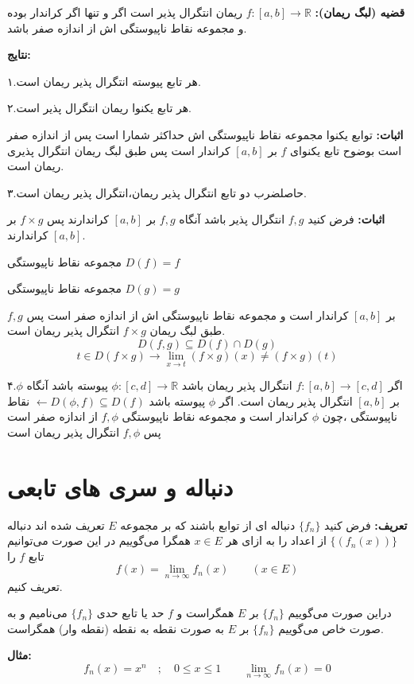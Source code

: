 \documentclass[12pt]{report}
\begin{document}
\textbf{قضیه (لبگ ریمان):}
$f:[a, b] \rightarrow \mathbb{R}$
ریمان انتگرال پذیر است اگر و تنها اگر کراندار بوده و مجموعه نقاط ناپیوستگی اش از اندازه صفر باشد.

\textbf{نتایج:}

۱.هر تابع پیوسته انتگرال پذیر ریمان است.

۲.هر تابع یکنوا ریمان انتگرال پذیر است.

\textbf{اثبات:}
توابع یکنوا مجموعه نقاط ناپیوستگی اش حداکثر شمارا است  پس از اندازه صفر است بوضوح تابع یکنوای 
$f$ 
بر 
$[a, b]$
 کراندار است پس طبق لبگ ریمان انتگرال پذیری ریمان است.
 
 ۳.حاصلضرب دو تابع انتگرال پذیر ریمان،انتگرال پذیر ریمان است.
 
 \textbf{اثبات:}
 فرض کنید 
 $f, g$
 انتگرال پذیر باشد آنگاه
 $f, g$
 بر 
 $[a, b]$
 کراندارند پس 
 $f \times g$
  بر
 $[a, b]$
کراندارند.

مجموعه نقاط ناپیوستگی 
$D(f)=f$

مجموعه نقاط ناپیوستگی 
$D(g) = g$
 
$f, g$
بر
$[a, b]$
کراندار است  و مجموعه نقاط ناپیوستگی اش  از اندازه صفر است پس طبق لبگ ریمان 
$f\times g$
انتگرال پذیر ریمان است.
\[
D(f, g) \subseteq D(f) \cap D(g)
\]
\[
t \in D(f\times g) \rightarrow \lim_{x \to t} (f\times g)(x) \neq (f\times g)(t)
\]

۴.اگر
$f:[a, b]\rightarrow [c, d]$
انتگرال پذیر ریمان باشد
$\phi:[c, d]\rightarrow\mathbb{R}$
پیوسته باشد آنگاه 
$\phi$
بر
$[a, b]$
انتگرال پذیر ریمان است.
اگر
$\phi$
پیوسته باشد 
$\leftarrow D(\phi, f) \subseteq D(f)$
نقاط ناپیوستگی ،چون 
$\phi$
کراندار است و مجموعه نقاط ناپیوستگی 
$f, \phi$
از اندازه صفر است پس
$f, \phi$
انتگرال پذیر ریمان است




	\chapter{دنباله و سری های تابعی}
	\label{ch۲}
	\textbf{تعریف:}
	فرض کنید
	$\{f_n\}$
	دنباله ای از توابع باشند که بر مجموعه 
	$E$
	تعریف شده اند دنباله
	$\{(f_n(x))\}$
	از اعداد را به ازای هر 
	$x \in E$
	همگرا می‌گوییم در این صورت می‌توانیم تابع 
	$f$
	را
	\[
	f(x) = \lim_{n \to \infty} f_n(x) \qquad (x \in E)
	\]
	تعریف ‌کنیم.
	
	دراین صورت می‌گوییم
	$\{f_n\}$
	بر
	$E$
	همگراست و 
	$f$
	حد یا تابع حدی
	$\{f_n\}$
	می‌نامیم و به صورت خاص می‌گوییم
	$\{f_n\}$
	بر
	$E$
	به صورت نقطه به نقطه (نقطه وار) همگراست.
	
	\textbf{مثال:}
	\[
	f_n(x) = x^n \quad ; \quad 0\leq x \leq 1 \qquad \lim_{n \to \infty} f_n(x) = 0
	\]
	
\end{document}
